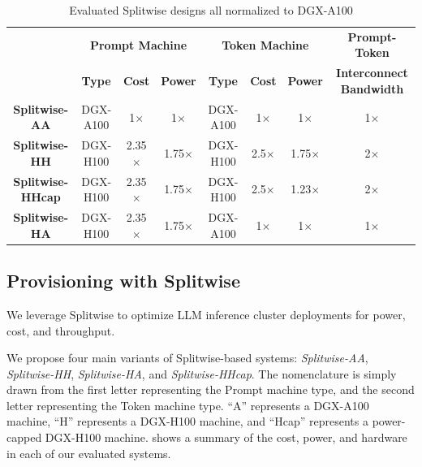 \begin{table}[]
\centering
\footnotesize
\begin{tabular}{@{}cccccccc@{}}
\toprule
                      &\multicolumn{3}{c}{\textbf{Prompt Machine}} & \multicolumn{3}{c}{\textbf{Token Machine}}  &\textbf{Prompt-Token}\\
                      & \textbf{Type}   &\textbf{Cost}  &\textbf{Power}     & \textbf{Type}   &\textbf{Cost}  &\textbf{Power} &\textbf{Interconnect Bandwidth} \\\midrule                  
\textbf{Splitwise-AA}         &DGX-A100     & 1$\times$     & 1$\times$ &DGX-A100     & 1$\times$     & 1$\times$     & 1$\times$                \\
\textbf{Splitwise-HH}          &DGX-H100     & 2.35$\times$     & 1.75$\times$ &DGX-H100     & 2.5$\times$     & 1.75$\times$  & 2$\times$    \\
\textbf{Splitwise-HHcap}       &DGX-H100     & 2.35$\times$     & 1.75$\times$ &DGX-H100     & 2.5$\times$     & 1.23$\times$  & 2$\times$   \\
\textbf{Splitwise-HA}      &DGX-H100     & 2.35$\times$     & 1.75$\times$ &DGX-A100     & 1$\times$     & 1$\times$  & 1$\times$   \\
\bottomrule
\end{tabular}
\caption{Evaluated Splitwise designs all normalized to DGX-A100}
\label{tab:systems_evaluated}
\end{table}



\subsection{Provisioning with Splitwise}
\label{sec:provision}
We leverage Splitwise to optimize LLM inference cluster deployments for power, cost, and throughput.

We propose four main variants of Splitwise-based systems:
\emph{Splitwise-AA},
\emph{Splitwise-HH},
\emph{Splitwise-HA},
and \emph{Splitwise-HHcap}.
The nomenclature is simply drawn from the first letter representing the Prompt machine type, and the second letter representing the Token machine type.
``A'' represents a DGX-A100 machine, ``H'' represents a DGX-H100 machine,
and ``Hcap'' represents a power-capped DGX-H100 machine.
 shows a summary of the cost, power, and hardware in each of our evaluated systems.

